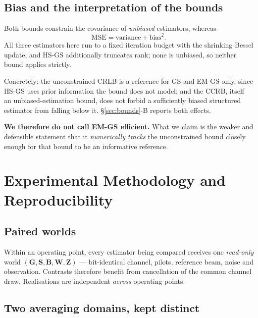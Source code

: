 \documentclass[journal]{IEEEtran}
\newcommand{\bG}{\mathbf{G}}
\newcommand{\bS}{\mathbf{S}}
\newcommand{\bB}{\mathbf{B}}
\newcommand{\bW}{\mathbf{W}}
\newcommand{\bZ}{\mathbf{Z}}
\begin{document}
\subsection{Bias and the interpretation of the bounds}

Both bounds constrain the covariance of \emph{unbiased} estimators, whereas
\begin{equation}\label{eq:mse}
\mathrm{MSE}=\mathrm{variance}+\mathrm{bias}^2 .
\end{equation}
All three estimators here run to a fixed iteration budget with the shrinking
Bessel update, and HS-GS additionally truncates rank; none is unbiased, so
neither bound applies strictly.

Concretely: the unconstrained CRLB is a reference for GS and EM-GS only, since
HS-GS uses prior information the bound does not model; and the CCRB, itself an
unbiased-estimation bound, does not forbid a sufficiently biased structured
estimator from falling below it. \S\ref{sec:bounds}-B reports both effects.

\textbf{We therefore do not call EM-GS efficient.} What we claim is the weaker
and defensible statement that it \emph{numerically tracks} the unconstrained
bound closely enough for that bound to be an informative reference.

\section{Experimental Methodology and Reproducibility}\label{sec:setup}

\subsection{Paired worlds}

Within an operating point, every estimator being compared receives one
\emph{read-only} world $(\bG,\bS,\bB,\bW,\bZ)$ --- bit-identical channel,
pilots, reference beam, noise and observation. Contrasts therefore benefit from
cancellation of the common channel draw. Realisations are independent
\emph{across} operating points.

\subsection{Two averaging domains, kept distinct}
\end{document}
